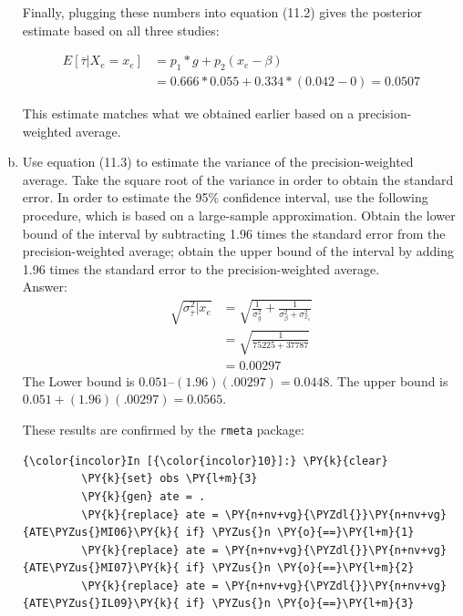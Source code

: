 \documentclass[11pt,notitlepage]{article}\usepackage[]{graphicx}\usepackage[]{color}
\makeatletter
\newenvironment{kframe}{%
 \def\at@end@of@kframe{}%
 \ifinner\ifhmode%
  \def\at@end@of@kframe{\end{minipage}}%
  \begin{minipage}{\columnwidth}%
 \fi\fi%
 \def\FrameCommand##1{\hskip\@totalleftmargin \hskip-\fboxsep
 \colorbox{shadecolor}{##1}\hskip-\fboxsep
     \hskip-\linewidth \hskip-\@totalleftmargin \hskip\columnwidth}%
 \MakeFramed {\advance\hsize-\width
   \@totalleftmargin\z@ \linewidth\hsize
   \@setminipage}}%
 {\par\unskip\endMakeFramed%
 \at@end@of@kframe}
\newenvironment{knitrout}{}{} %
\makeatother
\begin{document}
\begin{enumerate}[a)]
Finally, plugging these numbers into equation (11.2) gives the posterior estimate based on all three studies:

\begin{align*}
E[\bar{\tau}|X_e = x_e] &= p_1*g + p_2(x_e - \beta) \\
&= 0.666 * 0.055 +0.334 * (0.042-0) = 0.0507
\end{align*}

This estimate matches what we obtained earlier based on a precision-weighted average.


\item Use equation (11.3) to estimate the variance of the precision-weighted average. Take the square root of the variance in order to obtain the standard error. In order to estimate the 95\% confidence interval, use the following procedure, which is based on a large-sample approximation. Obtain the lower bound of the interval by subtracting 1.96 times the standard error from the precision-weighted average; obtain the upper bound of the interval by adding 1.96 times the standard error to the precision-weighted average.\\
Answer:\\
\begin{align*}
\sqrt{\sigma^2_{\bar{\tau}}|x_e} &= \sqrt{\frac{1}{\sigma^2_g} + \frac{1}{\sigma^2_{\beta} + \sigma^2_{x_e}}}\\
&=\sqrt{\frac{1}{75225+37787}}\\
&= 0.00297
\end{align*}
The Lower bound is $0.051 – (1.96)(.00297)=0.0448$.  The upper bound is $0.051+ (1.96)(.00297)=0.0565$.

These results are confirmed by the \texttt{rmeta} package:
\begin{knitrout}
\color{fgcolor}\begin{kframe}
    \begin{Verbatim}[commandchars=\\\{\}]
{\color{incolor}In [{\color{incolor}10}]:} \PY{k}{clear}
         \PY{k}{set} obs \PY{l+m}{3}
         \PY{k}{gen} ate = .
         \PY{k}{replace} ate = \PY{n+nv+vg}{\PYZdl{}}\PY{n+nv+vg}{ATE\PYZus{}MI06}\PY{k}{ if} \PYZus{}n \PY{o}{==}\PY{l+m}{1}
         \PY{k}{replace} ate = \PY{n+nv+vg}{\PYZdl{}}\PY{n+nv+vg}{ATE\PYZus{}MI07}\PY{k}{ if} \PYZus{}n \PY{o}{==}\PY{l+m}{2}
         \PY{k}{replace} ate = \PY{n+nv+vg}{\PYZdl{}}\PY{n+nv+vg}{ATE\PYZus{}IL09}\PY{k}{ if} \PYZus{}n \PY{o}{==}\PY{l+m}{3}
         

\end{Verbatim}
\end{kframe}
\end{knitrout}
\end{enumerate}
\end{document}
